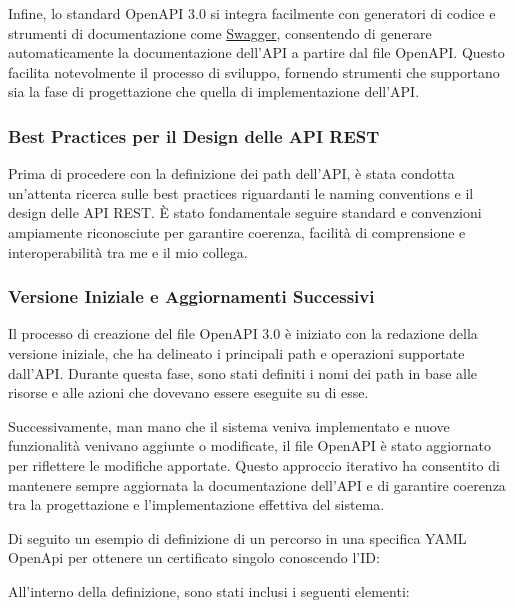Infine, lo standard OpenAPI 3.0 si integra facilmente con generatori di codice e strumenti di documentazione come \href{https://swagger.io/}{Swagger}, consentendo di generare automaticamente la documentazione dell'API a partire dal file OpenAPI. Questo facilita notevolmente il processo di sviluppo, fornendo strumenti che supportano sia la fase di progettazione che quella di implementazione dell'API.

\subsubsection{Best Practices per il Design delle API REST}

Prima di procedere con la definizione dei path dell'API, è stata condotta un'attenta ricerca sulle best practices riguardanti le naming conventions e il design delle API REST. È stato fondamentale seguire standard e convenzioni ampiamente riconosciute per garantire coerenza, facilità di comprensione e interoperabilità tra me e il mio collega.

\subsubsection{Versione Iniziale e Aggiornamenti Successivi}

Il processo di creazione del file OpenAPI 3.0 è iniziato con la redazione della versione iniziale, che ha delineato i principali path e operazioni supportate dall'API. Durante questa fase, sono stati definiti i nomi dei path in base alle risorse e alle azioni che dovevano essere eseguite su di esse.

Successivamente, man mano che il sistema veniva implementato e nuove funzionalità venivano aggiunte o modificate, il file OpenAPI è stato aggiornato per riflettere le modifiche apportate. Questo approccio iterativo ha consentito di mantenere sempre aggiornata la documentazione dell'API e di garantire coerenza tra la progettazione e l'implementazione effettiva del sistema.

\vspace{0,3cm}

Di seguito un esempio di definizione di un percorso in una specifica YAML OpenApi per ottenere un certificato singolo conoscendo l'ID:



All'interno della definizione, sono stati inclusi i seguenti elementi:

